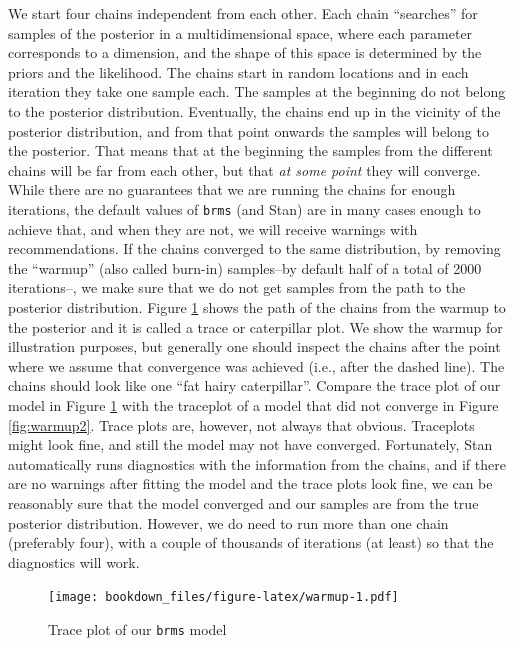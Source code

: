 \documentclass[12pt,]{krantz}
\theoremstyle{definition}
\theoremstyle{definition}
\theoremstyle{definition}
\theoremstyle{remark}
\begin{document}
We start four chains independent from each other. Each chain ``searches'' for samples of the posterior in a multidimensional space, where each parameter corresponds to a dimension, and the shape of this space is determined by the priors and the likelihood. The chains start in random locations and in each iteration they take one sample each. The samples at the beginning do not belong to the posterior distribution. Eventually, the chains end up in the vicinity of the posterior distribution, and from that point onwards the samples will belong to the posterior. That means that at the beginning the samples from the different chains will be far from each other, but that \emph{at some point} they will converge. While there are no guarantees that we are running the chains for enough iterations, the default values of \texttt{brms} (and Stan) are in many cases enough to achieve that, and when they are not, we will receive warnings with recommendations. If the chains converged to the same distribution, by removing the ``warmup'' (also called burn-in) samples--by default half of a total of 2000 iterations--, we make sure that we do not get samples from the path to the posterior distribution. Figure \ref{fig:warmup} shows the path of the chains from the warmup to the posterior and it is called a trace or caterpillar plot. We show the warmup for illustration purposes, but generally one should inspect the chains after the point where we assume that convergence was achieved (i.e., after the dashed line). The chains should look like one ``fat hairy caterpillar''. Compare the trace plot of our model in Figure \ref{fig:warmup} with the traceplot of a model that did not converge in Figure \ref{fig:warmup2}. Trace plots are, however, not always that obvious. Traceplots might look fine, and still the model may not have converged. Fortunately, Stan automatically runs diagnostics with the information from the chains, and if there are no warnings after fitting the model and the trace plots look fine, we can be reasonably sure that the model converged and our samples are from the true posterior distribution. However, we do need to run more than one chain (preferably four), with a couple of thousands of iterations (at least) so that the diagnostics will work.



\begin{figure}
\centering
\texttt{[image: bookdown\_files/figure-latex/warmup-1.pdf]}
\caption{\label{fig:warmup}Trace plot of our \texttt{brms} model}
\end{figure}
\end{document}
